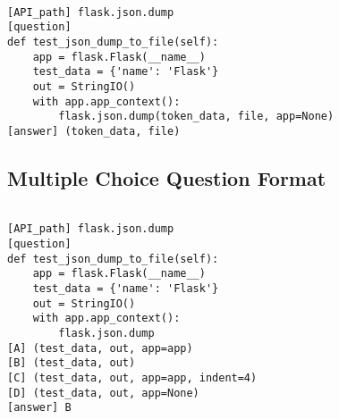 \begin{tcolorbox}[colback=gray!5!white, width=\linewidth, left=1mm, right=-3mm, top=1mm, bottom=1mm]
\begin{Verbatim}[fontsize=\normalsize]

[API_path] flask.json.dump
[question]
def test_json_dump_to_file(self):
    app = flask.Flask(__name__)
    test_data = {'name': 'Flask'}
    out = StringIO()
    with app.app_context():
        flask.json.dump(token_data, file, app=None)
[answer] (token_data, file)

\end{Verbatim}
\end{tcolorbox}

\subsection{Multiple Choice Question Format}

\begin{tcolorbox}[colback=gray!5!white, width=\linewidth, left=1mm, right=-3mm, top=1mm, bottom=1mm]
\begin{Verbatim}[fontsize=\normalsize]

[API_path] flask.json.dump
[question]
def test_json_dump_to_file(self):
    app = flask.Flask(__name__)
    test_data = {'name': 'Flask'}
    out = StringIO()
    with app.app_context():
        flask.json.dump
[A] (test_data, out, app=app)
[B] (test_data, out)
[C] (test_data, out, app=app, indent=4)
[D] (test_data, out, app=None)
[answer] B

\end{Verbatim}
\end{tcolorbox}
